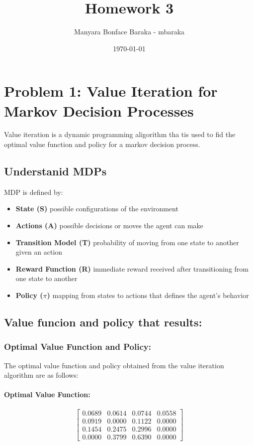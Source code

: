 \documentclass{article}
\begin{document}
\title{Homework 3}
\author{Manyara Bonface Baraka - mbaraka}
\date{\today}
\maketitle

\section*{Problem 1: Value Iteration for Markov Decision Processes}
Value iteration is a dynamic programming aligorithm tha tis used to fid the optimal value function and policy for a markov decision process.

\subsection*{Understanid MDPs}
MDP is defined by:
\begin{itemize}
    \item \textbf{State (S)} possible configurations of the environment
    \item \textbf{Actions (A)} possible decisions or moves the agent can make
    \item \textbf{Transition Model (T)} probability of moving from one state to another given an action
    \item \textbf{Reward Function (R)} immediate reward received after transitioning from one state to another
    \item \textbf{Policy (\(\pi\))} mapping from states to actions that defines the agent's behavior
\end{itemize}

\subsection*{Value funcion and policy that results:}
\subsubsection*{Optimal Value Function and Policy:}

The optimal value function and policy obtained from the value iteration algorithm are as follows:

\paragraph{Optimal Value Function:}
\[
\begin{bmatrix}
0.0689 & 0.0614 & 0.0744 & 0.0558 \\
0.0919 & 0.0000 & 0.1122 & 0.0000 \\
0.1454 & 0.2475 & 0.2996 & 0.0000 \\
0.0000 & 0.3799 & 0.6390 & 0.0000
\end{bmatrix}
\]
\end{document}
